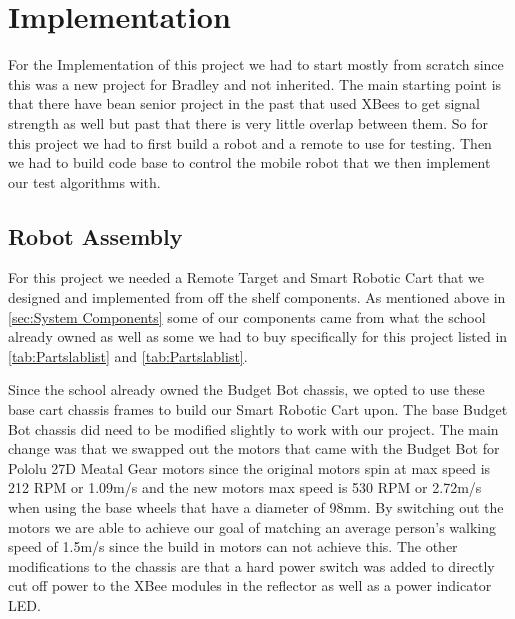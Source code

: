\chapter{Implementation}
\label{ch: Chapter5}

For the Implementation of this project we had to start mostly from scratch since this was a new project for Bradley and not inherited.  The main starting point is that there have bean senior project in the past that used XBees to get signal strength as well but past that there is very little overlap between them. So for this project we had to first build a robot and a remote to use for testing. Then we had to build code base to control the mobile robot that we then implement our test algorithms with.

\section{Robot Assembly}
\label{sec:Robot Assembly}

For this project we needed a Remote Target and Smart Robotic Cart that we designed and implemented from off the shelf components.  As mentioned above in \autoref{sec:System Components} some of our components came from what the school already owned as well as some we had to buy specifically for this project listed in \autoref{tab:Partslablist} and \autoref{tab:Partslablist}.

\vspace*{12pt}
\noindent
Since the school already owned the Budget Bot chassis, we opted to use these base cart chassis frames to build our Smart Robotic Cart upon.  The base Budget Bot chassis did need to be modified slightly to work with our project.  The main change was that we swapped out the motors that came with the Budget Bot for Pololu 27D Meatal Gear motors since the original motors spin at max speed is 212 RPM or 1.09m/s and the new motors max speed is 530 RPM or 2.72m/s when using the base wheels that have a diameter of 98mm.  By switching out the motors we are able to achieve our goal of  matching an average person's walking speed of 1.5m/s since the build in motors can not achieve this. The other modifications to the chassis are that a hard power switch was added to directly cut off power to the XBee modules in the reflector as well as a power indicator LED.

